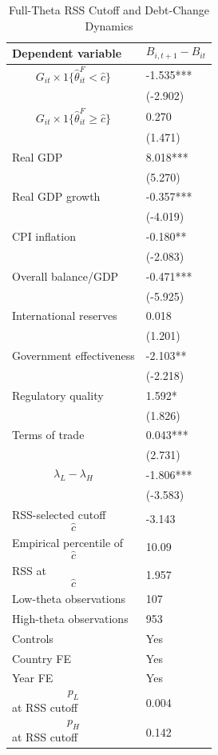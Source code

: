 \begin{table}[H]\centering
\begin{threeparttable}
\caption{Full-Theta RSS Cutoff and Debt-Change Dynamics}
\label{tab:deltaB_rss_cutoff_fulltheta}
\scriptsize
\begin{tabularx}{\textwidth}{lY}
\toprule
Dependent variable & $$B_{i,t+1}-B_{it}$$ \\
\midrule
$$G_{it}\times 1\{\widehat{\theta}^{F}_{it}<\widehat{c}\}$$ & -1.535*** \\
 & (-2.902) \\
$$G_{it}\times 1\{\widehat{\theta}^{F}_{it}\geq\widehat{c}\}$$ & 0.270 \\
 & (1.471) \\
Real GDP & 8.018*** \\
 & (5.270) \\
Real GDP growth & -0.357*** \\
 & (-4.019) \\
CPI inflation & -0.180** \\
 & (-2.083) \\
Overall balance/GDP & -0.471*** \\
 & (-5.925) \\
International reserves & 0.018 \\
 & (1.201) \\
Government effectiveness & -2.103** \\
 & (-2.218) \\
Regulatory quality & 1.592* \\
 & (1.826) \\
Terms of trade & 0.043*** \\
 & (2.731) \\
$$\lambda_L-\lambda_H$$ & -1.806*** \\
 & (-3.583) \\
\midrule
RSS-selected cutoff $$\widehat{c}$$ & -3.143 \\
Empirical percentile of $$\widehat{c}$$ & 10.09 \\
RSS at $$\widehat{c}$$ & 1.957 \\
Low-theta observations & 107 \\
High-theta observations & 953 \\
Controls & Yes \\
Country FE & Yes \\
Year FE & Yes \\
$$p_L$$ at RSS cutoff & 0.004 \\
$$p_H$$ at RSS cutoff & 0.142 \\

\end{tabularx}
\end{threeparttable}
\end{table}
